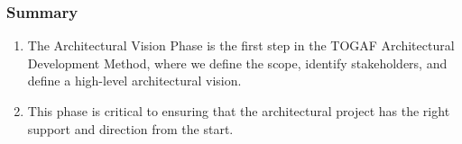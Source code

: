 \documentclass[aspectratio=169, table]{beamer}
\begin{document}
    \begin{frame}
        \frametitle{Summary}
        \begin{enumerate}
            \item The Architectural Vision Phase is the first step in the TOGAF Architectural Development Method, where we define the scope, identify stakeholders, and define a high-level architectural vision.
            \item This phase is critical to ensuring that the architectural project has the right support and direction from the start.
        \end{enumerate}

    \end{frame}
\end{document}
